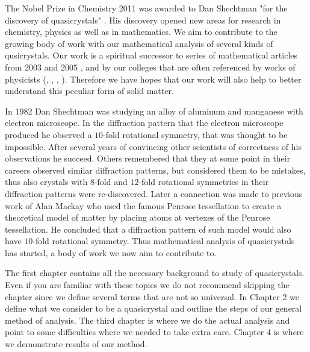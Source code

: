 \documentclass[text.tex]{subfiles}
\begin{document}
The Nobel Prize in Chemistry 2011 was awarded to Dan Shechtman "for the discovery of quasicrystals" \cite{nobel}. His discovery opened new areas for research in chemistry, physics as well as in mathematics. We aim to contribute to the growing body of work with our mathematical analysis of several kinds of qusicrystals. Our work is a spiritual successor to series of mathematical articles from 2003 and 2005 \cite{classification}, \cite{classificationII} and \cite{classificationIII} by our colleges that are often referenced by works of physicists (\cite{mention01}, \cite{mention02}, \cite{mention03}, \cite{mention04}). Therefore we have hopes that our work will also help to better understand this peculiar form of solid matter. 

In 1982 Dan Shechtman was studying an alloy of aluminum and manganese with electron microscope. In the diffraction pattern that the electron microscope produced he observed a $10$-fold rotational symmetry, that was thought to be impossible. After several years of convincing other scientists of correctness of his observations he succeed. Others remembered that they at some point in their careers observed similar diffraction patterns, but considered them to be mistakes, thus also crystals with $8$-fold and $12$-fold rotational symmetries in their diffraction patterns were re-discovered. Later a connection was made to previous work of Alan Mackay who used the famous Penrose tessellation to create a theoretical model of matter by placing atoms at vertexes of the Penrose tessellation. He concluded that a diffraction pattern of such model would also have $10$-fold rotational symmetry. Thus mathematical analysis of quasicrystals has started, a body of work we now aim to contribute to. 

The first chapter contains all the necessary background to study of quasicrystals. Even if you are familiar with these topics we do not recommend skipping the chapter since we define several terms that are not so universal. In Chapter 2 we define what we consider to be a quasicrystal and outline the steps of our general method of analysis. The third chapter is where we do the actual analysis and point to some difficulties where we needed to take extra care. Chapter 4 is where we demonstrate results of our method. 
\end{document}

